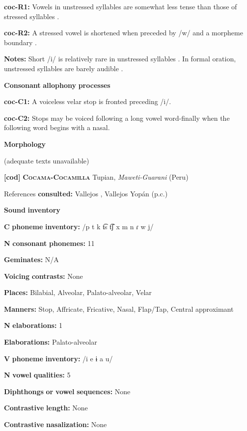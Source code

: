 \textbf{coc-R1:} Vowels in unstressed syllables are somewhat less tense than those of stressed syllables \citep[22]{Crawford1966}.

\textbf{coc-R2:} A stressed vowel is shortened when preceded by /w/ and a morpheme boundary \citep[67]{Bendixen1980}.

\textbf{Notes:} Short /i/ is relatively rare in unstressed syllables \citep[32]{Crawford1966}. In formal oration, unstressed syllables are barely audible \citep[332-3]{Bendixen1980}.

\textbf{Consonant} \textbf{allophony} \textbf{processes}

\textbf{coc-C1:} A voiceless velar stop is fronted preceding /i/. \citep[15]{Crawford1966}

\textbf{coc-C2:} Stops may be voiced following a long vowel word-finally when the following word begins with a nasal. \citep[99-100]{Bendixen1980}

\textbf{Morphology}

(adequate texts unavailable)

\textbf{[cod]}   \textbf{\textsc{Cocama-Cocamilla}}  Tupian, \textit{Maweti-Guarani} (Peru)

References \textbf{consulted:} Vallejos \citet{Yopán2010}, Vallejos Yopán (p.c.)

\textbf{Sound} \textbf{inventory}

\textbf{C} \textbf{phoneme} \textbf{inventory:} /p t k t͡s t͡ʃ x m n ɾ w j/

\textbf{N} \textbf{consonant} \textbf{phonemes:} 11

\textbf{Geminates:} N/A

\textbf{Voicing} \textbf{contrasts:} None

\textbf{Places:} Bilabial, Alveolar, Palato-alveolar, Velar

\textbf{Manners:} Stop, Affricate, Fricative, Nasal, Flap/Tap, Central approximant

\textbf{N} \textbf{elaborations:} 1

\textbf{Elaborations:} Palato-alveolar

\textbf{V} \textbf{phoneme} \textbf{inventory:} /i e ɨ a u/

\textbf{N} \textbf{vowel} \textbf{qualities:} 5

\textbf{Diphthongs} \textbf{or} \textbf{vowel} \textbf{sequences:} None

\textbf{Contrastive} \textbf{length:} None

\textbf{Contrastive} \textbf{nasalization:} None

